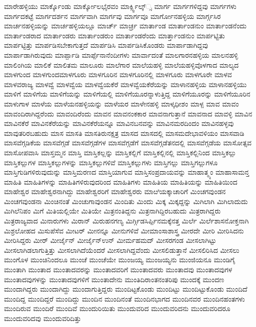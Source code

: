 {ಮಾರೇಹಳ್ಳಿಯು
ಮಾರ್ಕ್ಕೊಂಡು
ಮಾರ್ಕ್ಕೋಲಭೈರವಂ
ಮಾರ್ಕ್ಸ್ವಿಲ್ಕ್್ಸ
ಮಾರ್ಗ
ಮಾರ್ಗಗಳಿದ್ದವು
ಮಾರ್ಗಗಳು
ಮಾರ್ಗದಕಟ್ಟೆ
ಮಾರ್ಗದರ್ಶನ
ಮಾರ್ಗವಾಗಿ
ಮಾರ್ಗವು
ಮಾರ್ಗವೂ
ಮಾರ್ಗೋನಹಳ್ಳಿಯ
ಮಾರ್ಗ್ಗಸಿರ
ಮಾರ್ಚನಹಳ್ಳಿಯನ್ನು
ಮಾರ್ಚಹಳ್ಳಿಯಲ್ಲೂ
ಮಾರ್ಚ್
ಮಾರ್ಚ್ರ
ಮಾರ್ತಾಂಡ
ಮಾರ್ತಾಂಡನುಂ
ಮಾರ್ತಾಂಡನೆಂದು
ಮಾರ್ತಾಂಡರಾದ
ಮಾರ್ತಾಂಡರು
ಮಾರ್ತಾಂಡರುಂ
ಮಾರ್ತಾಂಡರೆಂದು
ಮಾರ್ತ್ತಾಂಡನುಂ
ಮಾರ್ಪಟ್ಟಿತು
ಮಾರ್ಪಟ್ಟಿತ್ತು
ಮಾರ್ಪಡಿಸಬೇಕಾಗುತ್ತದೆ
ಮಾರ್ಪಡಿಸಿ
ಮಾರ್ಪಡಿಸಿಕೊಂಡರು
ಮಾರ್ಪಾಡಾಗಿದ್ದವು
ಮಾರ್ಪಾಡಾಗಿರುವುದು
ಮಾರ್ಪ್ಪಾಡಿ
ಮಾರ್ಪ್ಪೆನಾನೆಂದೀಗಳು
ಮಾರ್ವಾದಂತೆ
ಮಾಲಗಾರನಹಳ್ಳಿಯ
ಮಾಲನಹಳ್ಳಿ
ಮಾಲಿಂಗಿಯ
ಮಾಲಿಕೆ
ಮಾಲಿತಮ
ಮಾಲೂರು
ಮಾಲೆಗಾರ
ಮಾಲೆಯಹಳ್ಳಿ
ಮಾಲೆಯಹಳ್ಳಿವೊಳಗಾದ
ಮಾಲ್ಯದ
ಮಾಳಗುಂದ
ಮಾಳಗುಂದಮಾಳಗೂರು
ಮಾಳಗೂರಿನ
ಮಾಳಗೂರಿನಲ್ಲಿ
ಮಾಳಗೂರು
ಮಾಳಗೂರೇ
ಮಾಳವ
ಮಾಳವರಾಜ್ಯ
ಮಾಳವ್ವೆ
ಮಾಳವ್ವೆಯ
ಮಾಳವ್ವೆಯಕೆರೆ
ಮಾಳವ್ವೆಯಕೆರೆಯನ್ನು
ಮಾಳಾನಹಳ್ಳಿಯ
ಮಾಳಾನಹಳ್ಳಿಯು
ಮಾಳಿಗೆ
ಮಾಳಿಗೆಯ
ಮಾಳಿಗೆಯನ್ನು
ಮಾಳಿಗೆಯಲ್ಲಿ
ಮಾಳಿಗೆಯೂರನ್ನಾಳುತ್ತಿದ್ದ
ಮಾಳಿಗೆಯೂರನ್ನು
ಮಾಳಿಗೆಯೂರಿನ
ಮಾಳುಗಾಳ
ಮಾಳೆಯ
ಮಾಳೆಯನಹಳ್ಳಿಯನ್ನು
ಮಾಳೆಯರ
ಮಾಳೇನಹಳ್ಳಿ
ಮಾಳ್ಕಧೀಶಂ
ಮಾಳ್ಪ
ಮಾವ
ಮಾವಂ
ಮಾವಂದಿರಾಗಿದ್ದರೆಂದು
ಮಾವಂದಿರೆಂದು
ಮಾವನ
ಮಾವನಂಕಕಾರ
ಮಾವನಾಗುತ್ತಾನೆ
ಮಾವನಾದ
ಮಾವಳ್ಳಿ
ಮಾವಿನ
ಮಾವಿನಕೆರೆ
ಮಾವಿನಕೆರೆಯನ್ನು
ಮಾವಿನಕೆರೆಯನ್ನೂ
ಮಾವಿನಬನವನ್ನು
ಮಾವಿನಮರದಿಂದಂ
ಮಾವಿನಹಳ್ಳವು
ಮಾವುತರಿರಬಹುದು
ಮಾಸ
ಮಾಸತಿ
ಮಾಸತಿರುನಕ್ಷತ್ರ
ಮಾಸದ
ಮಾಸದಲ್ಲಿ
ಮಾಸಮದೇಭಾವಳಿಯಂ
ಮಾಸವಾಡಿ
ಮಾಸವೆಗ್ಗಡಿಕೆಯ
ಮಾಸವೆಗ್ಗಡೆ
ಮಾಸವೆಗ್ಗಡೆಗಳ
ಮಾಸವೆಗ್ಗಡೆಗೆ
ಮಾಸವೆಗ್ಗಡೆತನದಲ್ಲಿ
ಮಾಸವೆಗ್ಗಡೆಯ
ಮಾಸೋತ್ಸವ
ಮಾಸೋಪವಾಸಿ
ಮಾಸ್ತಮ್ಮನ
ಮಾಸ್ತಿ
ಮಾಸ್ತಿಕಲ್ಲನ್ನು
ಮಾಸ್ತಿಕಲ್ಲಿಗೆ
ಮಾಸ್ತಿಕಲ್ಲಿನಲ್ಲಿ
ಮಾಸ್ತಿಕಲ್ಲಿನಿಂದ
ಮಾಸ್ತಿಕಲ್ಲು
ಮಾಸ್ತಿಕಲ್ಲುಗಳ
ಮಾಸ್ತಿಕಲ್ಲುಗಳನ್ನು
ಮಾಸ್ತಿಕಲ್ಲುಗಳಿವೆ
ಮಾಸ್ತಿಕಲ್ಲುಗಳು
ಮಾಸ್ತಿಗಲ್ಲು
ಮಾಸ್ತಿಗಲ್ಲುಗಳೂ
ಮಾಸ್ತಿಗುಡಿಗಳಿರುವುದುನ್ನು
ಮಾಸ್ತಿಮರಣದ
ಮಾಸ್ತಿಯಾಗುವ
ಮಾಸ್ತಿಸಂಪ್ರದಾಯವನ್ನು
ಮಾಹಾತ್ಮ್ಯಂ
ಮಾಹಾಸಾಮನ್ತ
ಮಾಹಿತಿ
ಮಾಹಿತಿಗಳನ್ನು
ಮಾಹಿತಿಗಳಿರುವುದರಿಂದ
ಮಾಹಿತಿಗಳು
ಮಾಹಿತಿಯ
ಮಾಹಿತಿಯನ್ನು
ಮಾಹಿತಿಯಿಂದ
ಮಾಹೇಶ್ವರ
ಮಾಹೇಶ್ವರನಾಗಿದ್ದು
ಮಾಹೇಶ್ವರರಿಗೆ
ಮಾಹೇಶ್ವರರು
ಮಾೞಿಯಕ್ಕಾಚಾರಿಗೆ
ಮಿಂಚಗವುಂಡನ
ಮಿಂಚಗವುಂಡನಾ
ಮಿಂಚಿನಂತೆ
ಮಿಂಚುಗಾವುಂಡನ
ಮಿಂದಿತು
ಮಿಂದು
ಮಿಕ್ಕ
ಮಿಕ್ಕದ್ದನ್ನು
ಮಿಗಿಲಾಗಿ
ಮಿಗಿಲಾದುದು
ಮಿಗಿಲೆನಿಪಂ
ಮಿಗೆ
ಮಿತಿಯಲ್ಲಿಯೇ
ಮಿತಿಯೇ
ಮಿತ್ರನಂತಿದ್ದನು
ಮಿತ್ರನಾಗಿದ್ದಿರಬಹುದು
ಮಿತ್ರರಾಗಿದ್ದರು
ಮಿತ್ರರಾಜ್ಯವಾದ
ಮಿನಾರುಗಳು
ಮಿರಾನ್
ಮಿರುಹನಗಣ್ಯ
ಮಿರ್ಗ್ಗಿಡಸಿರ್ಪ್ಪಿನಮಕ್ಕೆನತ್ತ
ಮಿರ್ಲೆ
ಮಿರ್ಲೆಶಾಸನೋಕ್ತನಾಗಿ
ಮಿಶ್ರಲೋಹದ
ಮಿಸುಪೆಸೆವ
ಮೀಟರ್
ಮೀನನ್ನೂ
ಮೀನುಗಳಿವೆ
ಮೀಮಾಂಸಾಶಾಸ್ತ್ರ
ಮೀರದೇ
ಮೀರಿ
ಮೀರಿಸಿದನು
ಮೀರಿಸಿದ್ದರು
ಮೀರ್
ಮೀರ್ಜೈನ್
ಮೀರ್ಜೈನ್ಉನ್
ಮೀರ್ಮಹಮದ್
ಮೀಸರಗಂಡ
ಮೀಸಲಾಗಿಟ್ಟು
ಮೀಸಲಾಗಿಡಲಾಗುತ್ತಿತ್ತು
ಮೀಸಲಾಗಿದೆಯೆಂದರೆ
ಮೀಸಲಾಗಿದ್ದವೆಂದು
ಮೀಸಲಿಡುತ್ತಾನೆ
ಮೀಸಲಿರಿಸಿದ
ಮೀಸಲು
ಮುಂಗೊಳ
ಮುಂಚಿನಿಂದಲೂ
ಮುಂಚೆ
ಮುಂಚೆಯೇ
ಮುಂಜಯ್ಯ
ಮುಂಜಯ್ಯನು
ಮುಂಜಿಯನೂ
ಮುಂಡಿಗೈ
ಮುಂತಾಗಿ
ಮುಂತಾದ
ಮುಂತಾದವರನ್ನು
ಮುಂತಾದವರಿಗೆ
ಮುಂತಾದವರು
ಮುಂತಾದವು
ಮುಂತಾದವುಗಳ
ಮುಂತಾದವುಗಳನ್ನು
ಮುಂತಾದವುಗಳಿಗೆ
ಮುಂತಾದೇನು
ಮುಂತಿದಿರಾಂತನಂತರಿಪು
ಮುಂದಕ್ಕೆ
ಮುಂದಣ
ಮುಂದಾಗಿದ್ದರು
ಮುಂದಾಗಿದ್ದು
ಮುಂದಾಗುತ್ತಿದ್ದರು
ಮುಂದಿಟ್ಟಕೊಂಡು
ಮುಂದಿಟ್ಟು
ಮುಂದಿಟ್ಟುಕೊಂಡು
ಮುಂದಿದೆ
ಮುಂದಿದ್ದ
ಮುಂದಿದ್ದರೆ
ಮುಂದಿದ್ದು
ಮುಂದಿನ
ಮುಂದಿನಂತೆ
ಮುಂದಿನಭಾಗದ
ಮುಂದಿನವರ
ಮುಂದಿನಹಂತಗಳು
ಮುಂದಿರುವ
ಮುಂದಿರೆ
ಮುಂದಿವೆ
ಮುಂದುರಿಯಿತು
ಮುಂದುವರಿದ
ಮುಂದುವರಿದನು
ಮುಂದುವರಿದರೂ
ಮುಂದುವರಿದವು
ಮುಂದುವರಿದಿತ್ತು
}
